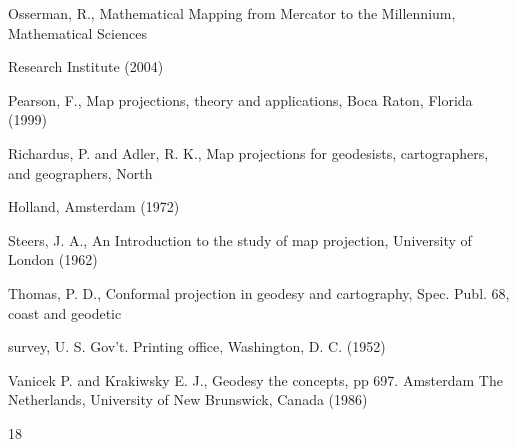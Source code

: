 \documentclass[a4paper,portrait,12pt]{article}
\begin{document}
\begin{flushleft}
[4] Osserman, R., Mathematical Mapping from Mercator to the Millennium, Mathematical Sciences
\end{flushleft}


\begin{flushleft}
Research Institute (2004)
\end{flushleft}


\begin{flushleft}
[5] Pearson, F., Map projections, theory and applications, Boca Raton, Florida (1999)
\end{flushleft}


\begin{flushleft}
[6] Richardus, P. and Adler, R. K., Map projections for geodesists, cartographers, and geographers, North
\end{flushleft}


\begin{flushleft}
Holland, Amsterdam (1972)
\end{flushleft}


\begin{flushleft}
[7] Steers, J. A., An Introduction to the study of map projection, University of London (1962)
\end{flushleft}


\begin{flushleft}
[8] Thomas, P. D., Conformal projection in geodesy and cartography, Spec. Publ. 68, coast and geodetic
\end{flushleft}


\begin{flushleft}
survey, U. S. Gov't. Printing office, Washington, D. C. (1952)
\end{flushleft}


\begin{flushleft}
[9] Vanicek P. and Krakiwsky E. J., Geodesy the concepts, pp 697. Amsterdam The Netherlands, University of New Brunswick, Canada (1986)
\end{flushleft}





18





\newpage
\end{document}
